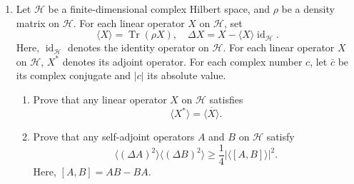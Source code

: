 \documentclass{article}
\begin{document}
\begin{enumerate}[label=\fbox{\arabic*}]
  \item Let $\mathcal{H}$ be a finite-dimensional complex Hilbert space, and $\rho$ be a density matrix on $\mathcal{H}$. For each linear operator $X$ on $\mathcal{H}$, set
        \[
          \langle X \rangle = \operatorname{Tr}(\rho X), \quad \Delta X = X - \langle X \rangle \operatorname{id}_{\mathcal{H}}.
        \]
        Here, $\operatorname{id}_{\mathcal{H}}$ denotes the identity operator on $\mathcal{H}$. For each linear operator $X$ on $\mathcal{H}$, $X^*$ denotes its adjoint operator. For each complex number $c$, let $\bar{c}$ be its complex conjugate and $|c|$ its absolute value.
        \begin{enumerate}[label=(\arabic*)]
          \item Prove that any linear operator $X$ on $\mathcal{H}$ satisfies
                \[
                  \langle X^* \rangle = \overline{\langle X \rangle}.
                \]
          \item Prove that any self-adjoint operators $A$ and $B$ on $\mathcal{H}$ satisfy
                \[
                  \langle (\Delta A)^2 \rangle \langle (\Delta B)^2 \rangle \ge \frac{1}{4} |\langle [A, B] \rangle|^2.
                \]
                Here, $[A, B] = AB - BA$.
        \end{enumerate}

\end{enumerate}

\newpage
\end{document}
